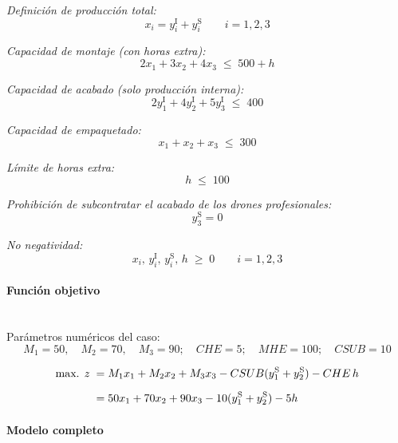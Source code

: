 \textit{Definición de producción total:}
\begin{equation}
x_i = y_i^{\mathrm{I}} + y_i^{\mathrm{S}} \qquad i = 1,2,3
\end{equation}

\textit{Capacidad de montaje (con horas extra):}
\begin{equation}
2x_1 + 3x_2 + 4x_3 \;\leq\; 500 + h
\end{equation}

\textit{Capacidad de acabado (solo producción interna):}
\begin{equation}
2y_1^{\mathrm{I}} + 4y_2^{\mathrm{I}} + 5y_3^{\mathrm{I}} \;\leq\; 400
\end{equation}

\textit{Capacidad de empaquetado:}
\begin{equation}
x_1 + x_2 + x_3 \;\leq\; 300
\end{equation}

\textit{Límite de horas extra:}
\begin{equation}
h \;\leq\; 100
\end{equation}

\textit{Prohibición de subcontratar el acabado de los drones profesionales:}
\begin{equation}
y_3^{\mathrm{S}} = 0
\end{equation}

\textit{No negatividad:}
\begin{equation}
x_i,\, y_i^{\mathrm{I}},\, y_i^{\mathrm{S}},\, h \;\geq\; 0 \qquad i=1,2,3
\end{equation}


\paragraph{Función objetivo}\mbox{}\\[-1mm]

Parámetros numéricos del caso:
\[
M_1 = 50,\quad M_2 = 70,\quad M_3 = 90;\quad
CHE = 5;\quad MHE = 100;\quad CSUB = 10
\]

\begin{align}
\mbox{max. } z \;=\;&
M_1x_1 + M_2x_2 + M_3x_3
- CSUB(y_1^{\mathrm{S}} + y_2^{\mathrm{S}})
- CHE\,h \notag\\[2mm]
=\;&
50x_1 + 70x_2 + 90x_3
- 10(y_1^{\mathrm{S}} + y_2^{\mathrm{S}})
- 5h
\end{align}


\paragraph{Modelo completo}\mbox{}\\[-1mm]

